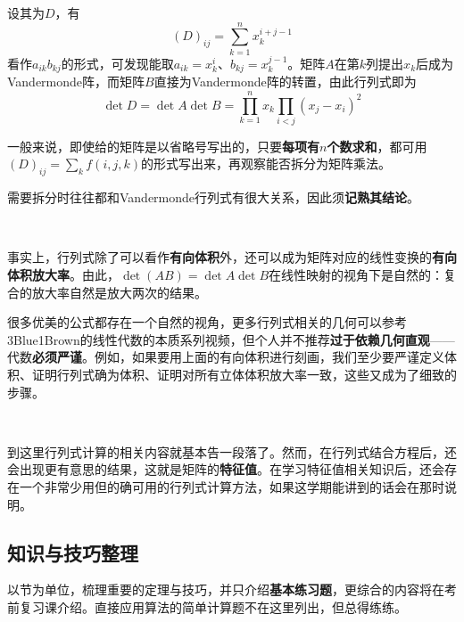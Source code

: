\documentclass[a4paper,UTF8,fontset=windows]{ctexart}
\newcommand*{\note}{\noindent *}
\begin{document}
设其为$D$，有
$$(D)_{ij}=\sum_{k=1}^nx_k^{i+j-1}$$
看作$a_{ik}b_{kj}$的形式，可发现能取$a_{ik}=x_k^i$、$b_{kj}=x_k^{j-1}$。矩阵$A$在第$k$列提出$x_k$后成为Vandermonde阵，而矩阵$B$直接为Vandermonde阵的转置，由此行列式即为
$$\det D=\det A\det B=\prod_{k=1}^nx_k\prod_{i<j}(x_j-x_i)^2$$

\note 一般来说，即使给的矩阵是以省略号写出的，只要\textbf{每项有$n$个数求和}，都可用$(D)_{ij}=\sum_kf(i,j,k)$的形式写出来，再观察能否拆分为矩阵乘法。

\note 需要拆分时往往都和Vandermonde行列式有很大关系，因此须\textbf{记熟其结论}。

\

事实上，行列式除了可以看作\textbf{有向体积}外，还可以成为矩阵对应的线性变换的\textbf{有向体积放大率}。由此，$\det(AB)=\det A\det B$在线性映射的视角下是自然的：复合的放大率自然是放大两次的结果。

\note 很多优美的公式都存在一个自然的视角，更多行列式相关的几何可以参考3Blue1Brown的线性代数的本质系列视频，但个人并不推荐\textbf{过于依赖几何直观}——代数\textbf{必须严谨}。例如，如果要用上面的有向体积进行刻画，我们至少要严谨定义体积、证明行列式确为体积、证明对所有立体体积放大率一致，这些又成为了细致的步骤。

\

\note 到这里行列式计算的相关内容就基本告一段落了。然而，在行列式结合方程后，还会出现更有意思的结果，这就是矩阵的\textbf{特征值}。在学习特征值相关知识后，还会存在一个非常少用但的确可用的行列式计算方法，如果这学期能讲到的话会在那时说明。

\subsection{知识与技巧整理}
\note 以节为单位，梳理重要的定理与技巧，并只介绍\textbf{基本练习题}，更综合的内容将在考前复习课介绍。直接应用算法的简单计算题不在这里列出，但总得练练。
\end{document}
